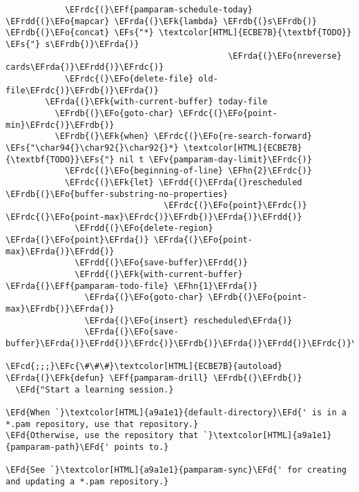 \documentclass[a4wide,10pt]{article}
\newcommand{\EFc}[1]{\textcolor{EFc}{#1}} %
\newcommand{\EFcd}[1]{\textcolor{EFcd}{#1}} %
\newcommand{\EFs}[1]{\textcolor{EFs}{#1}} %
\newcommand{\EFd}[1]{\textcolor{EFd}{#1}} %
\newcommand{\EFk}[1]{\textcolor{EFk}{#1}} %
\newcommand{\EFf}[1]{\textcolor{EFf}{#1}} %
\newcommand{\EFv}[1]{\textcolor{EFv}{#1}} %
\newcommand{\EFo}[1]{\textcolor{EFo}{#1}} %
\newcommand{\EFhn}[1]{\textcolor{EFhn}{\textbf{#1}}} %
\newcommand{\EFrda}[1]{\textcolor{EFrda}{#1}} %
\newcommand{\EFrdb}[1]{\textcolor{EFrdb}{#1}} %
\newcommand{\EFrdc}[1]{\textcolor{EFrdc}{#1}} %
\newcommand{\EFrdd}[1]{\textcolor{EFrdd}{#1}} %
\begin{document}
\begin{Code}
\begin{Verbatim}
            \EFrdc{(}\EFf{pamparam-schedule-today} \EFrdd{(}\EFo{mapcar} \EFrda{(}\EFk{lambda} \EFrdb{(}s\EFrdb{)} \EFrdb{(}\EFo{concat} \EFs{"*} \textcolor[HTML]{ECBE7B}{\textbf{TODO}} \EFs{"} s\EFrdb{)}\EFrda{)}
                                             \EFrda{(}\EFo{nreverse} cards\EFrda{)}\EFrdd{)}\EFrdc{)}
            \EFrdc{(}\EFo{delete-file} old-file\EFrdc{)}\EFrdb{)}\EFrda{)}
        \EFrda{(}\EFk{with-current-buffer} today-file
          \EFrdb{(}\EFo{goto-char} \EFrdc{(}\EFo{point-min}\EFrdc{)}\EFrdb{)}
          \EFrdb{(}\EFk{when} \EFrdc{(}\EFo{re-search-forward} \EFs{"\char94{}\char92{}\char92{}*} \textcolor[HTML]{ECBE7B}{\textbf{TODO}}\EFs{"} nil t \EFv{pamparam-day-limit}\EFrdc{)}
            \EFrdc{(}\EFo{beginning-of-line} \EFhn{2}\EFrdc{)}
            \EFrdc{(}\EFk{let} \EFrdd{(}\EFrda{(}rescheduled \EFrdb{(}\EFo{buffer-substring-no-properties}
                                \EFrdc{(}\EFo{point}\EFrdc{)} \EFrdc{(}\EFo{point-max}\EFrdc{)}\EFrdb{)}\EFrda{)}\EFrdd{)}
              \EFrdd{(}\EFo{delete-region} \EFrda{(}\EFo{point}\EFrda{)} \EFrda{(}\EFo{point-max}\EFrda{)}\EFrdd{)}
              \EFrdd{(}\EFo{save-buffer}\EFrdd{)}
              \EFrdd{(}\EFk{with-current-buffer} \EFrda{(}\EFf{pamparam-todo-file} \EFhn{1}\EFrda{)}
                \EFrda{(}\EFo{goto-char} \EFrdb{(}\EFo{point-max}\EFrdb{)}\EFrda{)}
                \EFrda{(}\EFo{insert} rescheduled\EFrda{)}
                \EFrda{(}\EFo{save-buffer}\EFrda{)}\EFrdd{)}\EFrdc{)}\EFrdb{)}\EFrda{)}\EFrdd{)}\EFrdc{)}\EFrdb{)}\EFrda{)}

\EFcd{;;;}\EFc{\#\#\#}\textcolor[HTML]{ECBE7B}{autoload}
\EFrda{(}\EFk{defun} \EFf{pamparam-drill} \EFrdb{(}\EFrdb{)}
  \EFd{"Start a learning session.}

\EFd{When `}\textcolor[HTML]{a9a1e1}{default-directory}\EFd{' is in a *.pam repository, use that repository.}
\EFd{Otherwise, use the repository that `}\textcolor[HTML]{a9a1e1}{pamparam-path}\EFd{' points to.}

\EFd{See `}\textcolor[HTML]{a9a1e1}{pamparam-sync}\EFd{' for creating and updating a *.pam repository.}


\end{Verbatim}
\end{Code}
\end{document}
